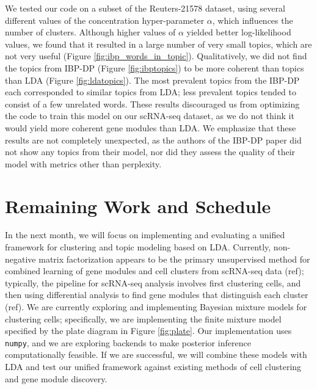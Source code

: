 \documentclass[11pt]{article}
\begin{document}
We tested our code on a subset of the Reuters-21578 dataset, using several different values of the concentration hyper-parameter $\alpha$, which influences the number of clusters. Although higher values of $\alpha$ yielded better log-likelihood values, we found that it resulted in a large number of very small topics, which are not very useful (Figure \ref{fig:ibp_words_in_topic}). Qualitatively, we did not find the topics from IBP-DP (Figure \ref{fig:ibptopics}) to be more coherent than topics than LDA (Figure \ref{fig:ldatopics}). The most prevalent topics from the IBP-DP each corresponded to similar topics from LDA; less prevalent topics tended to consist of a few unrelated words. These results discouraged us from optimizing the code to train this model on our scRNA-seq dataset, as we do not think it would yield more coherent gene modules than LDA. We emphasize that these results are not completely unexpected, as the authors of the IBP-DP paper did not show any topics from their model, nor did they assess the quality of their model with metrics other than perplexity.


\section{Remaining Work and Schedule}

In the next month, we will focus on implementing and evaluating a unified framework for clustering and topic modeling based on LDA. Currently, non-negative matrix factorization appears to be the primary unsupervised method for combined learning of gene modules and cell clusters from scRNA-seq data (ref); typically, the pipeline for scRNA-seq analysis involves first clustering cells, and then using differential analysis to find gene modules that distinguish each cluster (ref). We are currently exploring and implementing Bayesian mixture models for clustering cells; specifically, we are implementing the finite mixture model specified by the plate diagram in Figure \ref{fig:plate}. Our implementation uses \texttt{numpy}, and we are exploring backends to make posterior inference computationally feasible. If we are successful, we will combine these models with LDA and test our unified framework against existing methods of cell clustering and gene module discovery.
\end{document}
